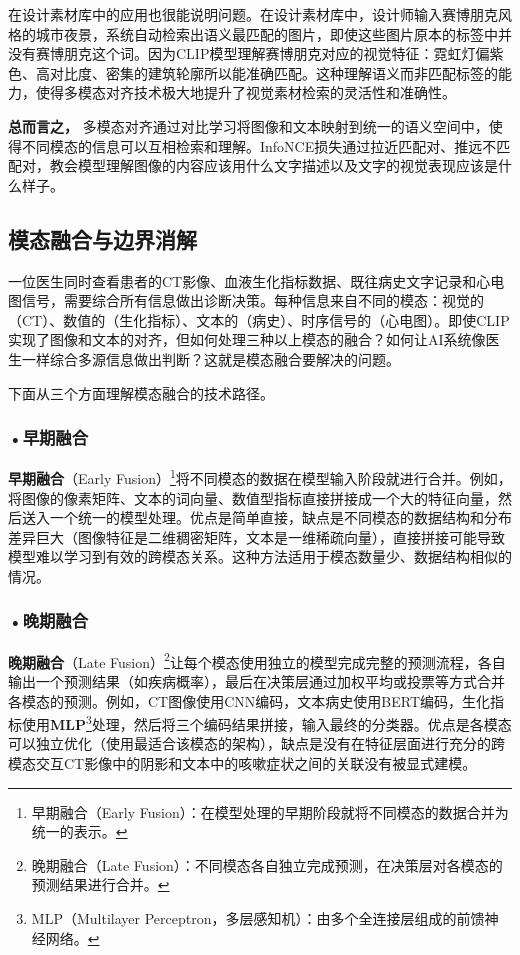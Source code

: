 在设计素材库中的应用也很能说明问题。在设计素材库中，设计师输入赛博朋克风格的城市夜景，系统自动检索出语义最匹配的图片，即使这些图片原本的标签中并没有赛博朋克这个词。因为CLIP模型理解赛博朋克对应的视觉特征：霓虹灯偏紫色、高对比度、密集的建筑轮廓所以能准确匹配。这种理解语义而非匹配标签的能力，使得多模态对齐技术极大地提升了视觉素材检索的灵活性和准确性。

\textbf{总而言之，} 多模态对齐通过对比学习将图像和文本映射到统一的语义空间中，使得不同模态的信息可以互相检索和理解。InfoNCE损失通过拉近匹配对、推远不匹配对，教会模型理解图像的内容应该用什么文字描述以及文字的视觉表现应该是什么样子。
\subsection{模态融合与边界消解}
一位医生同时查看患者的CT影像、血液生化指标数据、既往病史文字记录和心电图信号，需要综合所有信息做出诊断决策。每种信息来自不同的模态：视觉的（CT）、数值的（生化指标）、文本的（病史）、时序信号的（心电图）。即使CLIP实现了图像和文本的对齐，但如何处理三种以上模态的融合？如何让AI系统像医生一样综合多源信息做出判断？这就是模态融合要解决的问题。

下面从三个方面理解模态融合的技术路径。

\subsubsection*{\textbf{•早期融合}}

\textbf{早期融合}（Early Fusion）\footnote{早期融合（Early Fusion）：在模型处理的早期阶段就将不同模态的数据合并为统一的表示。}将不同模态的数据在模型输入阶段就进行合并。例如，将图像的像素矩阵、文本的词向量、数值型指标直接拼接成一个大的特征向量，然后送入一个统一的模型处理。优点是简单直接，缺点是不同模态的数据结构和分布差异巨大（图像特征是二维稠密矩阵，文本是一维稀疏向量），直接拼接可能导致模型难以学习到有效的跨模态关系。这种方法适用于模态数量少、数据结构相似的情况。

\subsubsection*{\textbf{•晚期融合}}

\textbf{晚期融合}（Late Fusion）\footnote{晚期融合（Late Fusion）：不同模态各自独立完成预测，在决策层对各模态的预测结果进行合并。}让每个模态使用独立的模型完成完整的预测流程，各自输出一个预测结果（如疾病概率），最后在决策层通过加权平均或投票等方式合并各模态的预测。例如，CT图像使用CNN编码，文本病史使用BERT编码，生化指标使用\textbf{MLP}\footnote{MLP（Multilayer Perceptron，多层感知机）：由多个全连接层组成的前馈神经网络。}处理，然后将三个编码结果拼接，输入最终的分类器。优点是各模态可以独立优化（使用最适合该模态的架构），缺点是没有在特征层面进行充分的跨模态交互CT影像中的阴影和文本中的咳嗽症状之间的关联没有被显式建模。

